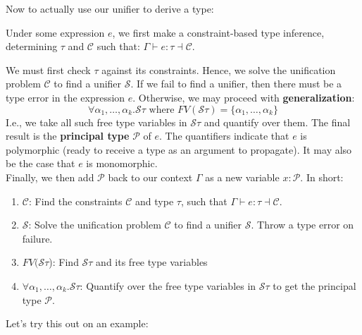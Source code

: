 \noindent
Now to actually use our unifier to derive a type:
\begin{Def} 

    Under some expression $e$, we first make a constraint-based type inference, determining $\tau$ and $\mathcal{C}$ such that:
    $\Gamma \vdash e : \tau \dashv \mathcal{C}$.

    
    We must first check $\tau$ against its constraints. Hence, we solve the unification problem $\mathcal{C}$ to find a unifier $\mathcal{S}$. If 
    we fail to find a unifier, then there must be a type error in the expression $e$. Otherwise, we may proceed with \textbf{generalization}:
    \[\forall \alpha_1, \ldots, \alpha_k . \mathcal{S}\tau \text{ where } FV(\mathcal{S}\tau) = \{\alpha_1, \ldots, \alpha_k\}\]
    \noindent
    I.e., we take all such free type variables in $\mathcal{S\tau}$ and quantify over them. The final result is the \textbf{principal type} $\mathcal{P}$ of $e$. The 
    quantifiers indicate that $e$ is polymorphic (ready to receive a type as an argument to propagate). It may also be the case that $e$ is monomorphic.\\
    \noindent
    Finally, we then add $\mathcal{P}$ back to our context $\Gamma$ as a new variable $x : \mathcal{P}$. In short: 
    \begin{enumerate}
        \item $\mathcal{C}$: Find the constraints $\mathcal{C}$ and type $\tau$, such that $\Gamma \vdash e : \tau \dashv \mathcal{C}$.
        \item $\mathcal{S}$: Solve the unification problem $\mathcal{C}$ to find a unifier $\mathcal{S}$. Throw a type error on failure.
        \item $FV( \mathcal{S}\tau$): Find $\mathcal{S}\tau$ and its free type variables
        \item $\forall \alpha_1, \ldots, \alpha_k . \mathcal{S}\tau$: Quantify over the free type variables in $\mathcal{S}\tau$ to get the principal type $\mathcal{P}$.
    \end{enumerate}    
\end{Def}

\newpage 
\noindent
Let's try this out on an example:

